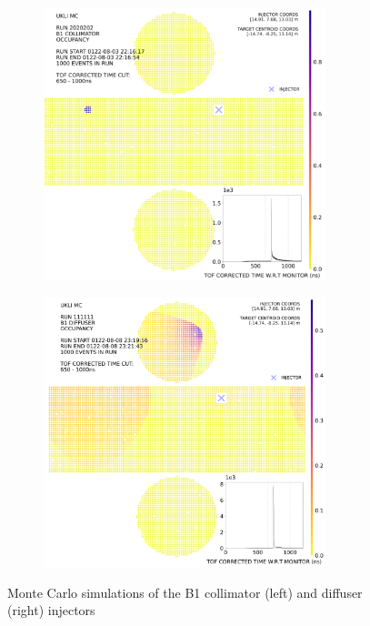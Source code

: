 \begin{figure}[htp]
    \begin{subfigure}{0.49\columnwidth}
    \centering
    \includegraphics[width=0.9\textwidth]{Figures/ukli_mc_B1.PNG}
    \label{fig:ukli_mc_coll}
    \end{subfigure}\hfill
    \begin{subfigure}{0.49\columnwidth}
    \centering
    \includegraphics[width=0.9\textwidth]{Figures/ukli_diff_mc_B1.PNG}
    \label{fig:ukli_mc_diff}
    \end{subfigure}
    \caption{Monte Carlo simulations of the B1 collimator (left) and diffuser (right) injectors}
    \label{fig:ukli_mc_diff_coll}
\end{figure}

